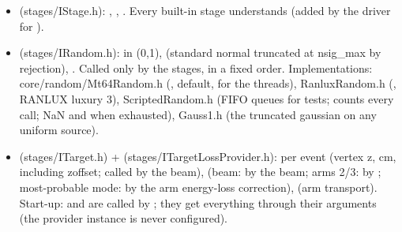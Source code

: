 \begin{itemize}
\item \textbf{} (stages/\allowbreak{}IStage.\allowbreak{}h): , , . Every built-in
stage understands  (added by the driver for ).
\item \textbf{} (stages/\allowbreak{}IRandom.\allowbreak{}h):  in (0,1),  (standard normal truncated at nsig\_max by
rejection), . Called only by the stages, in a fixed order. Implementations: core/\allowbreak{}random/\allowbreak{}Mt64Random.\allowbreak{}h
(, default,  for the threads), RanluxRandom.\allowbreak{}h (, RANLUX luxury 3),
ScriptedRandom.\allowbreak{}h (FIFO queues for tests; counts every call; NaN and  when exhausted), Gauss1.h (the
truncated gaussian on any uniform source).
\item \textbf{} (stages/\allowbreak{}ITarget.\allowbreak{}h) + \textbf{} (stages/\allowbreak{}ITargetLossProvider.\allowbreak{}h): per event
 (vertex z, cm, including zoffset; called by the beam),  (beam: by the beam; arms 2/3: by ; most-probable mode: by
the arm energy-loss correction),\allowbreak{}  (arm transport).
Start-up:  and  are
called by ; they get everything through their arguments (the provider instance is never configured).

\end{itemize}
